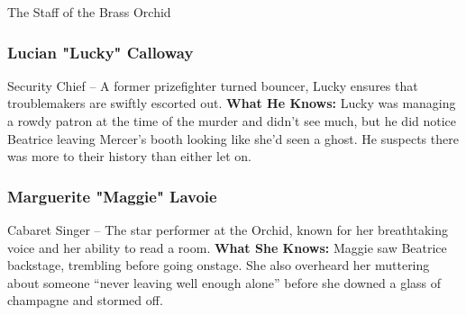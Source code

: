 \begin{NPC}[description=The people who keep the Orchid running]{The Staff of the Brass Orchid}
	\subsubsection*{Lucian "Lucky" Calloway}
	Security Chief – A former prizefighter turned bouncer, Lucky ensures that troublemakers are swiftly escorted out.
	\textbf{What He Knows:} Lucky was managing a rowdy patron at the time of the murder and didn't see much, but he did notice Beatrice leaving Mercer’s booth looking like she'd seen a ghost. He suspects there was more to their history than either let on.

	\subsubsection*{Marguerite "Maggie" Lavoie} 
	Cabaret Singer – The star performer at the Orchid, known for her breathtaking voice and her ability to read a room.
	\textbf{What She Knows:} Maggie saw Beatrice backstage, trembling before going onstage. She also overheard her muttering about someone “never leaving well enough alone” before she downed a glass of champagne and stormed off.
\end{NPC}